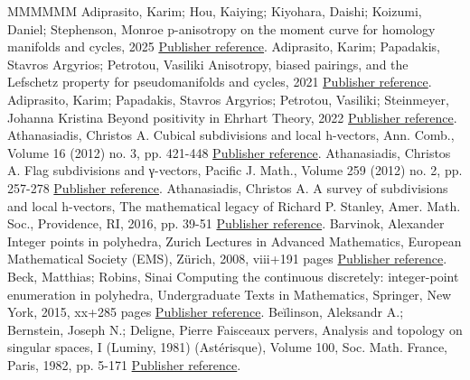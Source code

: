 \documentclass[11pt]{article}
\theoremstyle{definition}
\numberwithin{equation}{section}
\numberwithin{equation}{section}
\begin{document}
\begin{thebibliography}{MMMMMM}
 Adiprasito, Karim; Hou, Kaiying; Kiyohara, Daishi; Koizumi, Daniel; Stephenson, Monroe p-anisotropy on the moment curve for homology manifolds and cycles, 2025 \href{https://alco.centre-mersenne.org/articles/10.5802/alco.453/#moment}{Publisher reference}.
 Adiprasito, Karim; Papadakis, Stavros Argyrios; Petrotou, Vasiliki Anisotropy, biased pairings, and the Lefschetz property for pseudomanifolds and cycles, 2021 \href{https://alco.centre-mersenne.org/articles/10.5802/alco.453/#APP}{Publisher reference}.
 Adiprasito, Karim; Papadakis, Stavros Argyrios; Petrotou, Vasiliki; Steinmeyer, Johanna Kristina Beyond positivity in Ehrhart Theory, 2022 \href{https://alco.centre-mersenne.org/articles/10.5802/alco.453/#APPS}{Publisher reference}.
 Athanasiadis, Christos A. Cubical subdivisions and local h-vectors, Ann. Comb., Volume 16 (2012) no. 3, pp. 421-448 \href{https://alco.centre-mersenne.org/articles/10.5802/alco.453/#Athanasiadis12b}{Publisher reference}.
 Athanasiadis, Christos A. Flag subdivisions and γ-vectors, Pacific J. Math., Volume 259 (2012) no. 2, pp. 257-278 \href{https://alco.centre-mersenne.org/articles/10.5802/alco.453/#AthanasiadisFlag}{Publisher reference}.
 Athanasiadis, Christos A. A survey of subdivisions and local h-vectors, The mathematical legacy of Richard P. Stanley, Amer. Math. Soc., Providence, RI, 2016, pp. 39-51 \href{https://alco.centre-mersenne.org/articles/10.5802/alco.453/#AthanasiadisSurvey}{Publisher reference}.
 Barvinok, Alexander Integer points in polyhedra, Zurich Lectures in Advanced Mathematics, European Mathematical Society (EMS), Zürich, 2008, viii+191 pages \href{https://alco.centre-mersenne.org/articles/10.5802/alco.453/#BarvinokIntegerPolyhedra}{Publisher reference}.
 Beck, Matthias; Robins, Sinai Computing the continuous discretely: integer-point enumeration in polyhedra, Undergraduate Texts in Mathematics, Springer, New York, 2015, xx+285 pages \href{https://alco.centre-mersenne.org/articles/10.5802/alco.453/#BeckRobinsComputing}{Publisher reference}.
 Beĭlinson, Aleksandr A.; Bernstein, Joseph N.; Deligne, Pierre Faisceaux pervers, Analysis and topology on singular spaces, I (Luminy, 1981) (Astérisque), Volume 100, Soc. Math. France, Paris, 1982, pp. 5-171 \href{https://alco.centre-mersenne.org/articles/10.5802/alco.453/#BBDG}{Publisher reference}.

\end{thebibliography}
\end{document}
